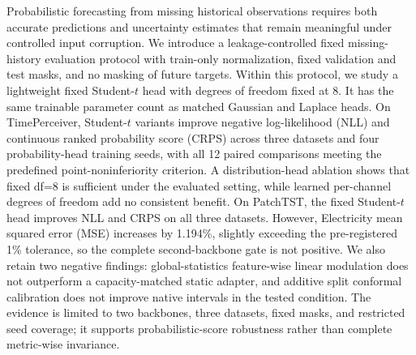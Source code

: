 Probabilistic forecasting from missing historical observations requires both accurate predictions and uncertainty estimates that remain meaningful under controlled input corruption. We introduce a leakage-controlled fixed missing-history evaluation protocol with train-only normalization, fixed validation and test masks, and no masking of future targets. Within this protocol, we study a lightweight fixed Student-$t$ head with degrees of freedom fixed at 8. It has the same trainable parameter count as matched Gaussian and Laplace heads. On TimePerceiver, Student-$t$ variants improve negative log-likelihood (NLL) and continuous ranked probability score (CRPS) across three datasets and four probability-head training seeds, with all 12 paired comparisons meeting the predefined point-noninferiority criterion. A distribution-head ablation shows that fixed df=8 is sufficient under the evaluated setting, while learned per-channel degrees of freedom add no consistent benefit. On PatchTST, the fixed Student-$t$ head improves NLL and CRPS on all three datasets. However, Electricity mean squared error (MSE) increases by 1.194\%, slightly exceeding the pre-registered 1\% tolerance, so the complete second-backbone gate is not positive. We also retain two negative findings: global-statistics feature-wise linear modulation does not outperform a capacity-matched static adapter, and additive split conformal calibration does not improve native intervals in the tested condition. The evidence is limited to two backbones, three datasets, fixed masks, and restricted seed coverage; it supports probabilistic-score robustness rather than complete metric-wise invariance.
